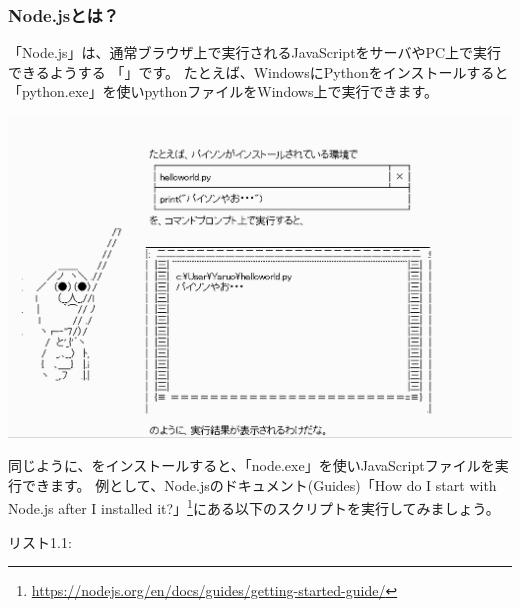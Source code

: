 \subsubsection*{Node.jsとは？}
\keeplastskip{
  \label{sec:1-1-1-1}
  \par\nobreak
}

「Node.js」は、通常ブラウザ上で実行されるJavaScriptをサーバやPC上で実行できるようする
「{}」です。
たとえば、WindowsにPythonをインストールすると「python.exe」を使いpythonファイルをWindows上で実行できます。

\begin{reviewimage}%
\includegraphics[width=1.0\maxwidth]{./images/01-createDevEnv/y01.png}%
\label{image:01-createDevEnv:y01}
\end{reviewimage}

同じように、{}をインストールすると、「node.exe」を使いJavaScriptファイルを実行できます。
例として、Node.jsのドキュメント(Guides)「How do I start with Node.js after I installed it?」\footnote{\url{https://nodejs.org/en/docs/guides/getting-started-guide/}}にある以下のスクリプトを実行してみましょう。


\clearpage

\def\startercodeblockfontsize{}
\begin{starterprogram}[_984064844]{リスト1.1: }\end{starterprogram}

